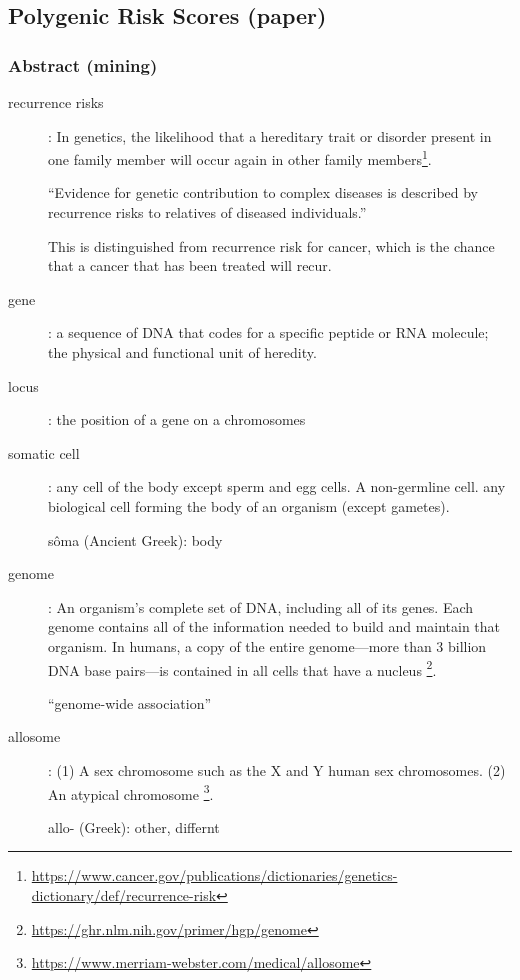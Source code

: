 \subsection{Polygenic Risk Scores (paper) \cite{wray2010multi}}
\subsubsection*{Abstract (mining)}
\begin{description}
\item[recurrence risks] :
	In genetics, the likelihood that a hereditary trait or disorder present in one family member will occur again in other family members\footnote{\url{https://www.cancer.gov/publications/dictionaries/genetics-dictionary/def/recurrence-risk}}.

	``Evidence for genetic contribution to complex diseases is described by recurrence risks to relatives of diseased individuals.''

	This is distinguished from recurrence risk for cancer, which is the chance that a cancer that has been treated will recur.

\item[gene] :
	a sequence of DNA that codes for a specific peptide or RNA molecule; the physical and functional unit of heredity.

\item[locus] :
	the position of a gene on a chromosomes

\item[somatic cell] :
	any cell of the body except sperm and egg cells. A non-germline cell. any biological cell forming the body of an organism (except gametes).

	sôma (Ancient Greek): body

\item[genome] :
	An organism’s complete set of DNA, including all of its genes. Each genome contains all of the information needed to build and maintain that organism. In humans, a copy of the entire genome—more than 3 billion DNA base pairs—is contained in all cells that have a nucleus \footnote{\url{https://ghr.nlm.nih.gov/primer/hgp/genome}}.

	``genome-wide association''

\item[allosome] :
	(1) A sex chromosome such as the X and Y human sex chromosomes. (2) An atypical chromosome \footnote{\url{https://www.merriam-webster.com/medical/allosome}}.

	allo- (Greek): other, differnt


\end{description}
